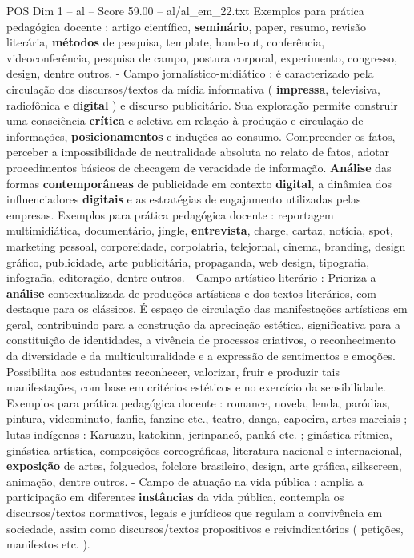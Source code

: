 \begin{textsample}{POS Dim 1 – al – Score 59.00 – al/al\_em\_22.txt}
Exemplos para prática pedagógica docente : artigo científico, \textbf{seminário}, paper, resumo, revisão literária, \textbf{métodos} de pesquisa, template, hand-out, conferência, videoconferência, pesquisa de campo, postura corporal, experimento, congresso, design, dentre outros. - Campo jornalístico-midiático : é caracterizado pela circulação dos discursos/textos da mídia informativa ( \textbf{impressa}, televisiva, radiofônica e \textbf{digital} ) e discurso publicitário.
Sua exploração permite construir uma consciência \textbf{crítica} e seletiva em relação à produção e circulação de informações, \textbf{posicionamentos} e induções ao consumo.
Compreender os fatos, perceber a impossibilidade de neutralidade absoluta no relato de fatos, adotar procedimentos básicos de checagem de veracidade de informação. \textbf{Análise} das formas \textbf{contemporâneas} de publicidade em contexto \textbf{digital}, a dinâmica dos influenciadores \textbf{digitais} e as estratégias de engajamento utilizadas pelas empresas.
Exemplos para prática pedagógica docente : reportagem multimidiática, documentário, jingle, \textbf{entrevista}, charge, cartaz, notícia, spot, marketing pessoal, corporeidade, corpolatria, telejornal, cinema, branding, design gráfico, publicidade, arte publicitária, propaganda, web design, tipografia, infografia, editoração, dentre outros. - Campo artístico-literário : Prioriza a \textbf{análise} contextualizada de produções artísticas e dos textos literários, com destaque para os clássicos.
É espaço de circulação das manifestações artísticas em geral, contribuindo para a construção da apreciação estética, significativa para a constituição de identidades, a vivência de processos criativos, o reconhecimento da diversidade e da multiculturalidade e a expressão de sentimentos e emoções.
Possibilita aos estudantes reconhecer, valorizar, fruir e produzir tais manifestações, com base em critérios estéticos e no exercício da sensibilidade.
Exemplos para prática pedagógica docente : romance, novela, lenda, paródias, pintura, videominuto, fanfic, fanzine etc., teatro, dança, capoeira, artes marciais ; lutas indígenas : Karuazu, katokinn, jerinpancó, panká etc. ; ginástica rítmica, ginástica artística, composições coreográficas, literatura nacional e internacional, \textbf{exposição} de artes, folguedos, folclore brasileiro, design, arte gráfica, silkscreen, animação, dentre outros. - Campo de atuação na vida pública : amplia a participação em diferentes \textbf{instâncias} da vida pública, contempla os discursos/textos normativos, legais e jurídicos que regulam a convivência em sociedade, assim como discursos/textos propositivos e reivindicatórios ( petições, manifestos etc. ).

\end{textsample}
